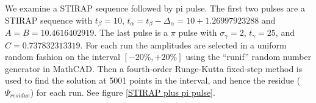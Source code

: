 We examine a STIRAP sequence followed by pi pulse. The first two pulses are a STIRAP sequence with $t_\beta=10$, $t_\alpha=t_\beta - \Delta_\alpha = 10 + 1.26997923288$ and $A=B=10.4616402919$. The last pulse is a $\pi$ pulse with $\sigma_\gamma=2$, $t_\gamma=25$, and $C=0.737832313319$. For each run the amplitudes are selected in a uniform random fashion on the interval $[-20\%,+20\%]$ using the ``runif'' random number generator in MathCAD. Then a fourth-order Runge-Kutta fixed-step method is used to find the solution at 5001 points in the interval, and hence the residue ($\Psi_{residue}$) for each run. See figure \ref{STIRAP plus pi pulse}.

